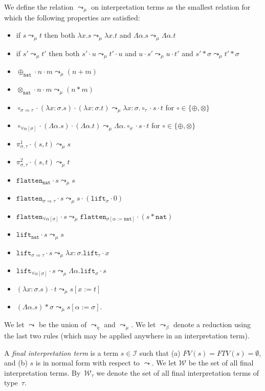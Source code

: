 \documentclass[runningheads,a4paper]{llncs}
\newcommand{\Iterms}{\mathcal{I}}
\newcommand{\World}{\mathcal{W}}
\newcommand{\quant}[2]{\forall #1[#2]}
\newcommand{\arrtype}{\Rightarrow}
\newcommand{\arreta}{\leadsto_\eta}
\newcommand{\arrbeta}{\leadsto_\beta}
\newcommand{\arrnormalise}{\leadsto}
\newcommand{\normstep}{\leadsto_\mu}
\newcommand{\abs}[2]{\lambda #1.#2}
\newcommand{\tabs}[2]{\Lambda #1.#2}
\newcommand{\app}[2]{#1 \cdot #2}
\newcommand{\tapp}[2]{#1 * #2}
\newcommand{\subst}[2]{#1:=#2}
\newcommand{\FTV}{\mathit{FTV}}
\newcommand{\FV}{\mathit{FV}}
\newcommand{\nat}{\mathtt{nat}}
\newcommand{\proj}{\pi}
\newcommand{\flatten}{\mathtt{flatten}}
\newcommand{\lift}{\mathtt{lift}}
\begin{document}
\begin{definition}
We define the relation $\normstep$ on interpretation terms as the
smallest relation for which the following properties are satisfied:
\begin{itemize}
\item if $s \normstep t$ then both $\abs{x}{s} \normstep \abs{x}{t}$ and
  $\tabs{\alpha}{s} \normstep \tabs{\alpha}{t}$
\item if $s' \normstep t'$ then both $\app{s'}{u} \normstep \app{t'}{u}$
  and $\app{u}{s'} \normstep \app{u}{t'}$ and $\tapp{s'}{\sigma} \normstep
  \tapp{t'}{\sigma}$
\item $\app{\app{\oplus_{\nat}}{n}}{m} \normstep (n+m)$ 
\item $\app{\app{\otimes_{\nat}}{n}}{m} \normstep (n * m)$ 
\item $\app{\app{\circ_{\sigma \arrtype \tau}}{(\abs{x:\sigma}{s})}}{
  (\abs{x:\sigma}{t})} \normstep \abs{x:\sigma}{\app{\app{\circ_\tau}{
  s}}{t}}$ for $\circ \in \{ \oplus, \otimes \}$
\item $\app{\app{\circ_{\quant{\alpha}{\sigma}}}{(\tabs{\alpha}{s})}}{
    (\tabs{\alpha}{t})} \normstep \tabs{\alpha}{\app{\app{\circ_\sigma}{s}}{t}}$
  for $\circ \in \{ \oplus, \otimes \}$
\item $\app{\proj^1_{\sigma,\tau}}{(s,t)} \normstep s$
\item $\app{\proj^2_{\sigma,\tau}}{(s,t)} \normstep t$
\item $\app{\flatten_\nat}{s} \normstep s$
\item $\app{\flatten_{\sigma \arrtype \tau}}{s} \normstep
  \app{s}{(\app{\lift_\sigma}{0})}$
\item $\app{\flatten_{\quant{\alpha}{\sigma}}}{s} \normstep
  \app{\flatten_{\sigma[\subst{\alpha}{\nat}]}}{(\tapp{s}{\nat})}$
\item $\app{\lift_\nat}{s} \normstep s$
\item $\app{\lift_{\sigma \arrtype \tau}}{s} \normstep
  \abs{x:\sigma}{\app{\lift_{\tau}}{x}}$
\item $\app{\lift_{\quant{\alpha}{\sigma}}}{s} \normstep
  \tabs{\alpha}{\app{\lift_{\sigma}}{s}}$
\item $\app{(\abs{x:\sigma}{s})}{t} \normstep s[\subst{x}{t}]$
\item $\tapp{(\tabs{\alpha}{s})}{\sigma} \normstep
  s[\subst{\alpha}{\sigma}]$.
\end{itemize}
We let $\arrnormalise$ be the union of $\arreta$ and $\normstep$.
We let $\arrbeta$ denote a reduction using the last two rules (which
may be applied anywhere in an interpretation term).

A \emph{final interpretation term} is a term $s \in \Iterms$ such that
(a) $\FV(s) = \FTV(s) = \emptyset$, and (b) $s$ is in normal form with
respect to $\arrnormalise$.  We let $\World$ be the set of all final
interpretation terms. By~$\World_\tau$ we denote the set of all final
interpretation terms of type~$\tau$.
\end{definition}
\end{document}
